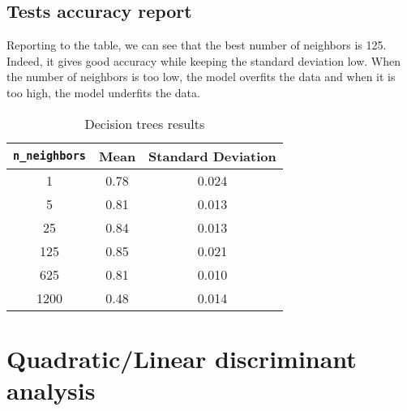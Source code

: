 \documentclass[12pt]{article}
\begin{document}
\subsection{Tests accuracy report}
Reporting to the table, we can see that the best number of neighbors is 125. 
Indeed, it gives good accuracy while keeping the standard deviation low. 
When the number of neighbors is too low, the model overfits the data and when it is too high, the model underfits the data.
	\begin{table}[H]
		\centering
		\begin{tabular}{|c|c|c|}
		\hline
		\verb|n_neighbors|               & Mean & Standard Deviation \\ \hline
		1                                & 0.78 & 0.024              \\ \hline
		5                                & 0.81 & 0.013              \\ \hline
		25                               & 0.84 & 0.013              \\ \hline
		125                              & 0.85 & 0.021              \\ \hline
		625                              & 0.81 & 0.010              \\ \hline
		1200                             & 0.48 & 0.014              \\ \hline

		\end{tabular}
		\caption{Decision trees results}
		\label{tab:results-knn}
	\end{table}



\section{Quadratic/Linear discriminant analysis}
\end{document}
